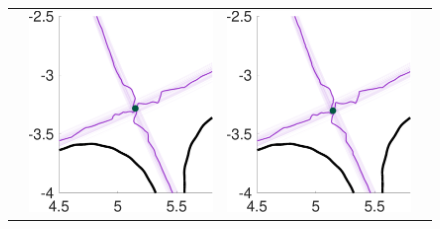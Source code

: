 \documentclass{beamer}
\begin{document}
\begin{frame}[t]
\begin{itemize}[leftmargin=5pt]
\begin{figure}[ht!]
{\begin{tabular}{cccc}
&\includegraphics[width=1\linewidth]{QoI_MLMC_uniform_xptRegion_L2norm.pdf} 
&\includegraphics[width=1\linewidth]{QoI_MLMC_surrogate_xptRegion.pdf} 

\end{tabular}}
\end{figure}
\end{itemize}
\end{frame}
\end{document}
